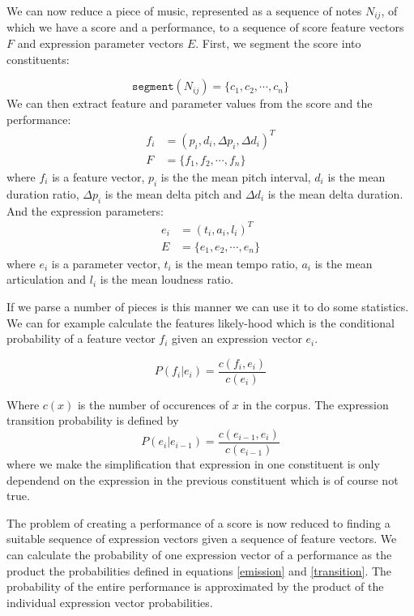 \documentclass[a4paper,10pt]{article}
\begin{document}
We can now reduce a piece of music, represented as a sequence of notes $N_{ij}$, of which we have a score and a performance, to a sequence of score feature vectors $F$ and expression parameter vectors $E$. First, we segment the score into constituents:

\[\texttt{segment}(N_{ij}) = \{c_1, c_2, \cdots, c_n\}\]
We can then extract feature and parameter values from the score and the performance:
\begin{align*}
f_i &= (p_i, d_i, \Delta p_i, \Delta d_i)^T\\
F &= \{f_1, f_2, \cdots, f_n\}
\end{align*}
where $f_i$ is a feature vector, $p_i$ is the the mean pitch interval, $d_i$ is the mean duration ratio, $\Delta p_i$ is the mean delta pitch and $\Delta d_i$ is the mean delta duration.
And the expression parameters: 
\begin{align*}
e_i &= (t_i, a_i, l_i)^T\\
E &= \{e_1, e_2, \cdots, e_n\}
\end{align*}
where $e_i$ is a parameter vector, $t_i$ is the mean tempo ratio, $a_i$ is the mean articulation and $l_i$ is the mean loudness ratio.

If we parse a number of pieces is this manner we can use it to do some statistics. We can for example calculate the features likely-hood which is the conditional probability of a feature vector $f_i$ given an expression vector $e_i$.

\begin{equation}
\label{emission}
P(f_i|e_i) = \frac{c(f_i, e_i)}{c(e_i)}
\end{equation}

Where $c(x)$ is the number of occurences of $x$ in the corpus.
The expression transition probability is defined by
\begin{equation}
\label{transition}
P(e_i|e_{i-1}) = \frac{c(e_{i-1}, e_i)}{c(e_{i-1})}
\end{equation}
where we make the simplification that expression in one constituent is only dependend on the expression in the previous constituent which is of course not true.

The problem of creating a performance of a score is now reduced to finding a suitable sequence of expression vectors given a sequence of feature vectors. We can calculate the probability of one expression vector of a performance as the product the probabilities defined in equations \ref{emission} and \ref{transition}. The probability of the entire performance is approximated by the product of the individual expression vector probabilities.
\end{document}
